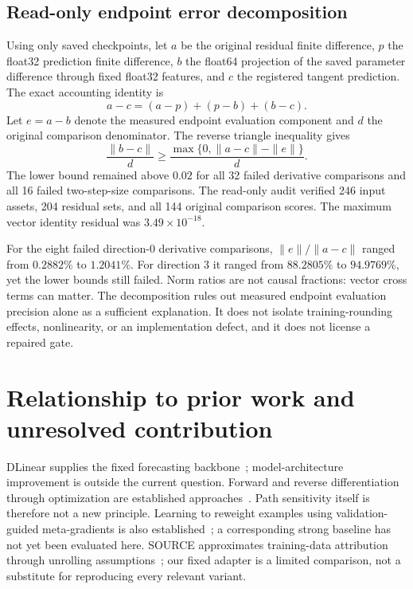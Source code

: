 \documentclass[11pt]{article}
\begin{document}
\subsection{Read-only endpoint error decomposition}
Using only saved checkpoints, let $a$ be the original residual finite difference, $p$ the float32 prediction finite difference, $b$ the float64 projection of the saved parameter difference through fixed float32 features, and $c$ the registered tangent prediction. The exact accounting identity is
\begin{equation}
 a-c=(a-p)+(p-b)+(b-c).
\end{equation}
Let $e=a-b$ denote the measured endpoint evaluation component and $d$ the original comparison denominator. The reverse triangle inequality gives
\begin{equation}
 \frac{\|b-c\|}{d}\geq
 \frac{\max\{0,\|a-c\|-\|e\|\}}{d}.
\end{equation}
The lower bound remained above $0.02$ for all 32 failed derivative comparisons and all 16 failed two-step-size comparisons. The read-only audit verified 246 input assets, 204 residual sets, and all 144 original comparison scores. The maximum vector identity residual was $3.49\times10^{-18}$.

For the eight failed direction-0 derivative comparisons, $\|e\|/\|a-c\|$ ranged from $0.2882\%$ to $1.2041\%$. For direction 3 it ranged from $88.2805\%$ to $94.9769\%$, yet the lower bounds still failed. Norm ratios are not causal fractions: vector cross terms can matter. The decomposition rules out measured endpoint evaluation precision alone as a sufficient explanation. It does not isolate training-rounding effects, nonlinearity, or an implementation defect, and it does not license a repaired gate.

\section{Relationship to prior work and unresolved contribution}
DLinear supplies the fixed forecasting backbone~\cite{dlinear}; model-architecture improvement is outside the current question. Forward and reverse differentiation through optimization are established approaches~\cite{franceschi}. Path sensitivity itself is therefore not a new principle. Learning to reweight examples using validation-guided meta-gradients is also established~\cite{ren}; a corresponding strong baseline has not yet been evaluated here. SOURCE approximates training-data attribution through unrolling assumptions~\cite{source}; our fixed adapter is a limited comparison, not a substitute for reproducing every relevant variant.
\end{document}
